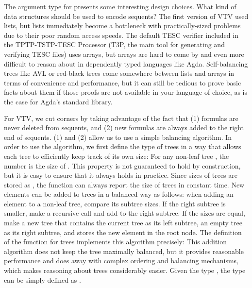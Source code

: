 \documentclass{lipics-v2021}
\begin{document}
The argument type  for  presents some 
interesting design choices. What kind of data structures should be used 
to encode sequents? The first version of VTV used lists, but lists immediately become 
a bottleneck with practically-sized problems due to their poor random access speeds. 
The default TESC verifier included in the TPTP-TSTP-TESC Processor (T3P, the main 
tool for generating and verifying TESC files) uses arrays, 
but arrays are hard to come by and even more difficult to reason about in dependently 
typed languages like Agda. Self-balancing trees like AVL or red-black trees come 
somewhere between lists and arrays in terms of convenience and performance, but it 
can still be tedious to prove basic facts about them if those proofs are not 
available in your language of choice, as is the case for Agda's standard library.

For VTV, we cut corners by taking advantage of the fact that (1) formulas 
are never deleted from sequents, and (2) new formulas are always added to the 
right end of sequents. (1) and (2) allow us to use a simple balancing algorithm.
In order to use the algorithm, we first define the type of trees in a way that 
allows each tree to efficiently keep track of its own size:
For any non-leaf tree     ,
the number  is the size of     .
This property is not guaranteed to hold by construction, but it is easy to ensure that it always holds in practice. 
Since sizes of trees are stored as , the function 
 \AgdaSymbol{:}   
can always report the size of trees in constant time. New elements can be added to trees 
in a balanced way as follows: when adding an element to a non-leaf tree, 
compare its subtree sizes. If the right subtree is smaller, make a recursive call and add to the 
right subtree. If the sizes are equal, make a new tree that contains the current tree as its left subtree, 
an empty tree as its right subtree, and stores the new element in the root node.
The definition of the  function for trees implements this algorithm precisely:
This addition algorithm does not keep the tree maximally balanced, but it provides 
reasonable performance and does away with complex ordering and balancing mechanisms, 
which makes reasoning about trees considerably easier. Given the type , 
the type  can be simply defined as .
\end{document}
